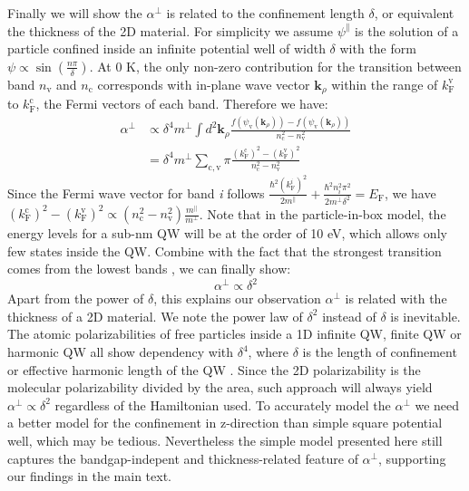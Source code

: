 \documentclass[manuscript=suppinfo,email=true,hyperref=true,keywords=false]{achemso}
\begin{document}
Finally we will show the $\alpha^{\perp}$ is related to the
confinement length $\delta$, or equivalent the thickness of the 2D
material. For simplicity we assume $\psi^{\parallel}$ is the solution
of a particle confined inside an infinite potential well of width
$\delta$ with the form $\psi \propto \sin(\frac{n\pi}{\delta})$. At 0
K, the only non-zero contribution for the transition between band
$n_{\mathrm{v}}$ and $n_{\mathrm{c}}$ corresponds with in-plane wave
vector $\mathbf{k}_{\rho}$ within the range of $k_{\mathrm{F}}^{\mathrm{v}}$ to
$k_{\mathrm{F}}^{\mathrm{c}}$, the Fermi vectors of each band. Therefore we have:
\begin{equation}
  \begin{aligned}
    \alpha^{\perp} &\propto \delta^{4} m^{\perp} \int
    d^{2}\mathbf{k}_{\rho}
    \frac{f(\psi_{\mathrm{v}}(\mathbf{k}_{\rho}))
      -f(\psi_{\mathrm{v}}(\mathbf{k}_{\rho})) }{n_{\mathrm{c}}^{2} -
      n_{\mathrm{v}}^{2}}\\
    &= \delta^{4} m^{\perp} \sum_{\mathrm{c, v}}\pi \frac{
      (k_{\mathrm{F}}^{\mathrm{c}})^{2} -
        (k_{\mathrm{F}}^{\mathrm{v}})^{2}}{n_{\mathrm{c}}^{2} -
        n_{\mathrm{v}}^{2}}
  \end{aligned}
\end{equation}
Since the Fermi wave vector for band \textit{i} follows
${\displaystyle
  \frac{\hbar^{2}(k_{\mathrm{F}}^{i})^{2}}{2m^{\parallel}}} +
{\displaystyle \frac{\hbar^{2} n_{i}^{2} \pi^{2}}{2m^{\perp}
    \delta^{2}}} = E_{\mathrm{F}}$, we have
$ (k_{\mathrm{F}}^{\mathrm{c}})^{2} -
(k_{\mathrm{F}}^{\mathrm{v}})^{2} \propto (n_{\mathrm{c}}^{2} -
n_{\mathrm{v}}^{2}) {\displaystyle
  \frac{m^{\parallel}}{m^{\perp}}}$. Note that in the particle-in-box
model, the energy levels for a sub-nm QW will be at the order of 10
eV, which allows only few states inside the QW. Combine with the fact
that the strongest transition comes from the lowest bands
\cite{davies_physics_1997}, we can finally show:
\begin{equation}
  \label{eq:alpha-perp-L}
  \alpha^{\perp} \propto \delta^{2}
\end{equation}
Apart from the power of $\delta$, this explains our observation
$\alpha^{\perp}$ is related with the thickness of a 2D material. We
note the power law of $\delta^{2}$ instead of $\delta$ is
inevitable. The atomic polarizabilities of free particles inside a 1D
infinite QW, finite QW or harmonic QW all show dependency with
$\delta^{4}$, where $\delta$ is the length of confinement or effective
harmonic length of the QW \cite{Fowler_1984,Maize_2011}. Since the 2D
polarizability is the molecular polarizability divided by the area,
such approach will always yield $\alpha^{\perp} \propto \delta^{2}$
regardless of the Hamiltonian used. To accurately model the
$\alpha^{\perp}$ we need a better model for the confinement in
z-direction than simple square potential well, which may be
tedious. Nevertheless the simple model presented here still captures
the bandgap-indepent and thickness-related feature of
$\alpha^{\perp}$, supporting our findings in the main text.
\end{document}
